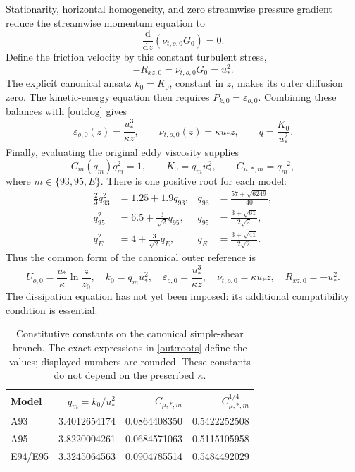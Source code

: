 \documentclass[11pt,a4paper]{article}
\numberwithin{equation}{section}
\newcommand{\eps}{\varepsilon}
\newcommand{\ust}{u_*}
\newcommand{\dd}{\mathrm d}
\begin{document}
Stationarity, horizontal homogeneity, and zero streamwise pressure
gradient reduce the streamwise momentum equation to
\begin{equation}
 \frac{\dd}{\dd z}(\nu_{t,o,0}G_0)=0.
\end{equation}
Define the friction velocity by this constant turbulent stress,
\begin{equation}
 -R_{xz,0}=\nu_{t,o,0}G_0=\ust^2.
 \label{out:constantstress}
\end{equation}
The explicit canonical ansatz $k_0=K_0$, constant in $z$, makes its
outer diffusion zero. The kinetic-energy equation then requires
$P_{k,0}=\eps_{o,0}$. Combining these balances with \cref{out:log}
gives
\begin{equation}
 \eps_{o,0}(z)=\frac{\ust^3}{\kappa z},\qquad
 \nu_{t,o,0}(z)=\kappa\ust z,\qquad
 q=\frac{K_0}{\ust^2}.
 \label{out:balances}
\end{equation}
Finally, evaluating the original eddy viscosity supplies
\begin{equation}
 \boxed{C_m(q_m)q_m^2=1,\qquad
        K_0=q_m\ust^2,\qquad C_{\mu,*,m}=q_m^{-2},}
 \label{out:rootcondition}
\end{equation}
where $m\in\{93,95,E\}$. There is one positive root for each model:
\begin{align}
 \frac23q_{93}^2&=1.25+1.9q_{93},
 &q_{93}&=\frac{57+\sqrt{6249}}{40},\nonumber\\
 q_{95}^2&=6.5+\frac3{\sqrt2}q_{95},
 &q_{95}&=\frac{3+\sqrt{61}}{2\sqrt2},\nonumber\\
 q_E^2&=4+\frac3{\sqrt2}q_E,
 &q_E&=\frac{3+\sqrt{41}}{2\sqrt2}.
 \label{out:roots}
\end{align}
Thus the common form of the canonical outer reference is
\begin{equation}
 \boxed{
 U_{o,0}=\frac{\ust}{\kappa}\ln\frac z{z_0},\quad
 k_0=q_m\ust^2,\quad
 \eps_{o,0}=\frac{\ust^3}{\kappa z},\quad
 \nu_{t,o,0}=\kappa\ust z,\quad
 R_{xz,0}=-\ust^2.}
 \label{out:reference}
\end{equation}
The dissipation equation has not yet been imposed: its additional
compatibility condition is essential.

\begin{table}[htbp]
\centering
\caption{Constitutive constants on the canonical simple-shear branch.
The exact expressions in \cref{out:roots} define the values; displayed
numbers are rounded. These constants do not depend on the prescribed
$\kappa$.}
\label{out:roottable}
\begin{tabular}{lrrr}
\toprule
Model & $q_m=k_0/\ust^2$ & $C_{\mu,*,m}$ & $C_{\mu,*,m}^{1/4}$\\
\midrule
A93 & 3.4012654174 & 0.0864408350 & 0.5422252508\\
A95 & 3.8220004261 & 0.0684571063 & 0.5115105958\\
E94/E95 & 3.3245064563 & 0.0904785514 & 0.5484492029\\
\bottomrule
\end{tabular}
\end{table}
\end{document}
